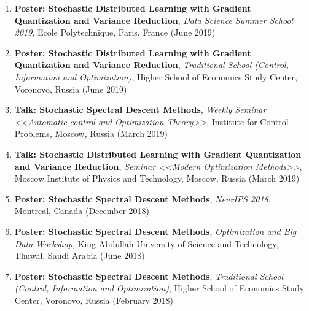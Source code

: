 \begin{enumerate}
\item {\bf Poster: Stochastic Distributed Learning with Gradient Quantization and Variance Reduction}, {\em Data Science Summer School 2019}, Ecole Polytechnique, Paris, France (June 2019)
\item {\bf Poster: Stochastic Distributed Learning with Gradient Quantization and Variance Reduction}, {\em Traditional School (Control, Information and Optimization)}, Higher School of Economics Study Center, Voronovo, Russia (June 2019)
\item {\bf Talk: Stochastic Spectral Descent Methods}, {\em Weekly Seminar <<Automatic control and Optimization Theory>>}, Institute for Control Problems, Moscow, Russia (March 2019)
\item {\bf Talk: Stochastic Distributed Learning with Gradient Quantization and Variance Reduction}, {\em Seminar <<Modern Optimization Methods>>}, Moscow Institute of Physics and Technology, Moscow, Russia (March 2019)
\item {\bf Poster: Stochastic Spectral Descent Methods}, {\em NeurIPS 2018}, Montreal, Canada (December 2018)
\item {\bf Poster: Stochastic Spectral Descent Methods}, {\em Optimization and Big Data Workshop}, King Abdullah University of Science and Technology, Thuwal, Saudi Arabia (June 2018)
\item {\bf Poster: Stochastic Spectral Descent Methods}, {\em Traditional School (Control, Information and Optimization)}, Higher School of Economics Study Center, Voronovo, Russia (February 2018)
\end{enumerate}
